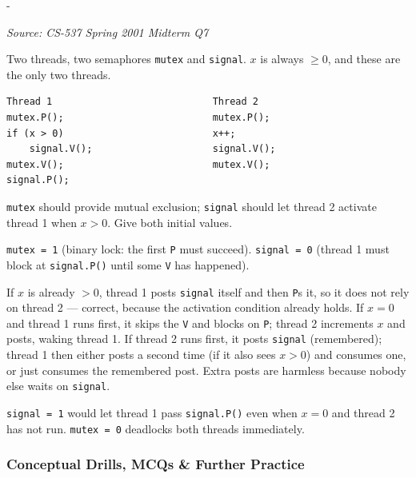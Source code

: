 \documentclass[11pt,a4paper]{article}
\makeatletter
\newcommand{\keepspace}[1]{\par\penalty-100\begingroup
  \setlength{\dimen@}{#1}\dimen@ii\pagegoal\advance\dimen@ii-\pagetotal
  \ifdim\dimen@>\dimen@ii\ifdim\dimen@ii>\z@\vfil\fi\break\fi\endgroup}
\newcounter{qn}[section]
\newenvironment{Qn}[4]{%
  \refstepcounter{qn}\keepspace{7\baselineskip}%
  \begin{tcolorbox}[qboxstyle, title={Q\thesection.\theqn\ \ [#1 \textbar\ #2]\ \ #4}]%
  {\footnotesize\color{g3}\textit{Source: #3}}\par\smallskip%
}{%
  \end{tcolorbox}%
}
\newenvironment{Sol}{%
  \begin{tcolorbox}[sboxstyle, title={Solution}]%
}{%
  \end{tcolorbox}\vspace{0.35em}%
}
\makeatother
\begin{document}
\begin{Qn}{Medium}{Lect 19}{CS-537 Spring 2001 Midterm Q7}{Initial values of \texttt{mutex} and \texttt{signal}}
Two threads, two semaphores \texttt{mutex} and \texttt{signal}. $x$ is
always $\ge 0$, and these are the only two threads.
\begin{lstlisting}[numbers=none]
Thread 1                            Thread 2
mutex.P();                          mutex.P();
if (x > 0)                          x++;
    signal.V();                     signal.V();
mutex.V();                          mutex.V();
signal.P();
\end{lstlisting}
\texttt{mutex} should provide mutual exclusion; \texttt{signal} should
let thread 2 activate thread 1 when $x > 0$. Give both initial values.
\end{Qn}
\begin{Sol}
\texttt{mutex = 1} (binary lock: the first \texttt{P} must succeed).
\texttt{signal = 0} (thread 1 must block at \texttt{signal.P()} until
some \texttt{V} has happened).

If $x$ is already $> 0$, thread 1 posts \texttt{signal} itself and then
\texttt{P}s it, so it does not rely on thread 2 --- correct, because the
activation condition already holds. If $x=0$ and thread 1 runs first, it
skips the \texttt{V} and blocks on \texttt{P}; thread 2 increments $x$
and posts, waking thread 1. If thread 2 runs first, it posts
\texttt{signal} (remembered); thread 1 then either posts a second time
(if it also sees $x>0$) and consumes one, or just consumes the remembered
post. Extra posts are harmless because nobody else waits on
\texttt{signal}.

\texttt{signal = 1} would let thread 1 pass \texttt{signal.P()} even when
$x=0$ and thread 2 has not run. \texttt{mutex = 0} deadlocks both
threads immediately.
\end{Sol}

\subsubsection*{Conceptual Drills, MCQs \& Further Practice}
\end{document}
